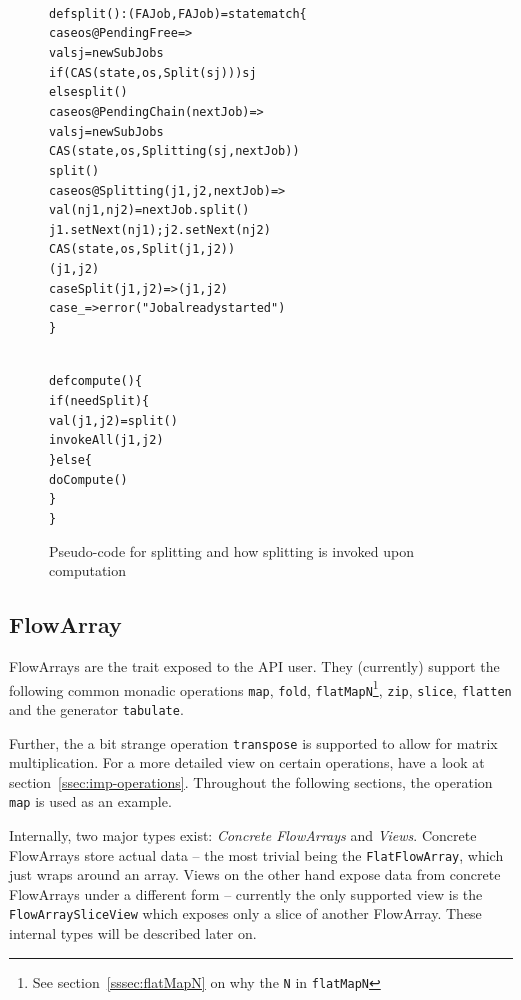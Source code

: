 \documentclass[runningheads,a4paper,fleqn]{llncs}
\begin{document}
\begin{figure}
\begin{minipage}[t]{7cm}
\begin{alltt}
{\scriptsize
def split(): (FAJob, FAJob) = state match \{
  case os@PendingFree =>
    val sj = newSubJobs
    if (CAS(state, os, Split(sj))) sj
    else split()
  case os@PendingChain(nextJob) =>
    val sj = newSubJobs
    CAS(state, os, Splitting(sj, nextJob))
    split()
  case os@Splitting(j1, j2, nextJob) =>
    val (nj1, nj2) = nextJob.split()
    j1.setNext(nj1); j2.setNext(nj2)
    CAS(state, os, Split(j1, j2))
    (j1, j2)
  case Split(j1, j2) => (j1, j2)
  case _ => error("Job already started")
\}
}
\end{alltt}
\end{minipage}
\begin{minipage}[t]{4cm}
\begin{alltt}
{\scriptsize
def compute() \{
  if (needSplit) \{
    val (j1, j2) = split()
    invokeAll(j1, j2)
  \} else \{
    doCompute()
  \}
\}
}
\end{alltt}
\end{minipage}
\caption{Pseudo-code for splitting and how splitting is invoked upon
  computation}
\label{fig:split-code}
\end{figure}

\subsection{FlowArray}
FlowArrays are the trait exposed to the API user. They (currently)
support the following common monadic operations \texttt{map},
\texttt{fold}, \texttt{flatMapN}\footnote{See
  section~\ref{sssec:flatMapN} on why the \texttt{N} in
  \texttt{flatMapN}}, \texttt{zip}, \texttt{slice}, \texttt{flatten}
and the generator \texttt{tabulate}.

Further, the a bit strange operation \texttt{transpose} is supported
to allow for matrix multiplication. For a more detailed view on
certain operations, have a look at
section~\ref{ssec:imp-operations}. Throughout the following sections,
the operation \texttt{map} is used as an example.

Internally, two major types exist: \emph{Concrete FlowArrays} and
\emph{Views}. Concrete FlowArrays store actual data -- the most
trivial being the \texttt{FlatFlowArray}, which just wraps around an
array. Views on the other hand expose data from
concrete FlowArrays under a different form -- currently the
only supported view is the \texttt{FlowArraySliceView} which exposes
only a slice of another FlowArray. These internal types will be
described later on.
\end{document}
